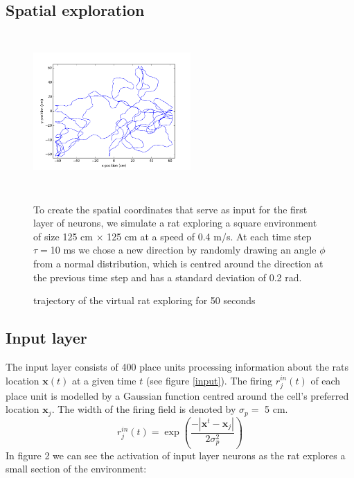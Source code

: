 \documentclass[a4paper, 12pt]{article}
\begin{document}
\subsection{Spatial exploration}
\begin{figure}[h]
\begin{minipage}{0.4\textwidth}
	\includegraphics[width=6cm, height=6cm]{pics/running_rat.png}
	\caption{\footnotesize{trajectory of the virtual rat exploring for 50 seconds}}
\end{minipage}
\begin{minipage}{0.6\textwidth}
To create the spatial coordinates that serve as input for the first layer of neurons, we simulate a rat exploring a square environment of size 125 cm $\times$ 125 cm at a speed of 0.4 m/s. At each time step $\tau=$10 ms we chose a new direction by randomly drawing an angle $\phi$ from a normal distribution, which is centred around the direction at the previous time step and has a standard deviation of 0.2 rad.   
\end{minipage}
\end{figure}


\subsection{Input layer}
The input layer consists of 400 place units processing information about the rats location $\boldsymbol{x}(t)$ at a given time $t$ (see figure \ref{input}). The firing $r_j^{in}(t)$ of each place unit is modelled  by a Gaussian function centred around the cell's preferred location $\boldsymbol{x}_j$. The width of the firing field is denoted by $\sigma_p=$ 5 cm. 
	\begin{equation}
	r_j^{in}(t)=\exp\left(\frac{-|\boldsymbol{x}^t-\boldsymbol{x}_j|}{2\sigma_p^2}\right)
	\end{equation}
In figure 2 we can see the activation of input layer neurons as the rat explores a small section of the environment:  
\end{document}
